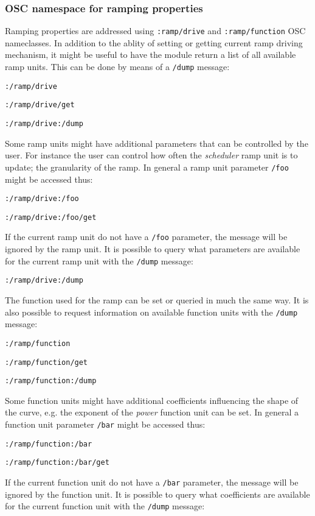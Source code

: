 \documentclass{sig-alternate}
\begin{document}
\subsubsection{OSC namespace for ramping properties} %
\label{ssub:osc_namespace_for_ramping_properties}

Ramping properties are addressed using \texttt{:ramp/drive} and \texttt{:ramp/function} OSC nameclasses. In addition to the ablity of setting or getting current ramp driving mechanism, it might be useful to have the module return a list of all available ramp units. This can be done by means of a \texttt{/dump} message:

\texttt{:/ramp/drive}

\texttt{:/ramp/drive/get}

\texttt{:/ramp/drive:/dump}

Some ramp units might have additional parameters that can be controlled by the user. For instance the user can control how often the \emph{scheduler} ramp unit is to update; the granularity of the ramp.  In general a ramp unit parameter \texttt{/foo} might be accessed thus:


\texttt{:/ramp/drive:/foo}

\texttt{:/ramp/drive:/foo/get}

If the current ramp unit do not have a \texttt{/foo} parameter, the message will be ignored by the ramp unit. It is possible to query what parameters are available for the current ramp unit with the \texttt{/dump} message:

\texttt{:/ramp/drive:/dump}

The function used for the ramp can be set or queried in much the same way. It is also possible to request information on available function units with the \texttt{/dump} message:

\texttt{:/ramp/function}

\texttt{:/ramp/function/get}

\texttt{:/ramp/function:/dump}

Some function units might have additional coefficients influencing the shape of the curve, e.g. the exponent of the \emph{power} function unit can be set. In general a function unit parameter \texttt{/bar} might be accessed thus:

\texttt{:/ramp/function:/bar}

\texttt{:/ramp/function:/bar/get}

If the current function unit do not have a \texttt{/bar} parameter, the message will be ignored by the function unit. It is possible to query what coefficients are available for the current function unit with the \texttt{/dump} message:
\end{document}
